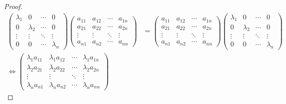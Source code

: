 \documentclass[class=linearalgebra,crop=false]{standalone}
\begin{document}
\begin{proof}
    \begingroup
    \allowdisplaybreaks
    \begin{align*}
        \begin{pmatrix}
            \lambda_{1} & 0           & \cdots & 0           \\
            0           & \lambda_{2} & \cdots & 0           \\
            \vdots      & \vdots      & \ddots & \vdots      \\
            0           & 0           & \cdots & \lambda_{n}
        \end{pmatrix}
        \begin{pmatrix}
            a_{11} & a_{12} & \cdots & a_{1n} \\
            a_{21} & a_{22} & \cdots & a_{2n} \\
            \vdots & \vdots & \ddots & \vdots \\
            a_{n1} & a_{n2} & \cdots & a_{nn}
        \end{pmatrix}
         & =
        \begin{pmatrix}
            a_{11} & a_{12} & \cdots & a_{1n} \\
            a_{21} & a_{22} & \cdots & a_{2n} \\
            \vdots & \vdots & \ddots & \vdots \\
            a_{n1} & a_{n2} & \cdots & a_{nn}
        \end{pmatrix}
        \begin{pmatrix}
            \lambda_{1} & 0           & \cdots & 0           \\
            0           & \lambda_{2} & \cdots & 0           \\
            \vdots      & \vdots      & \ddots & \vdots      \\
            0           & 0           & \cdots & \lambda_{n}
        \end{pmatrix} \\
        \Longleftrightarrow
        \begin{pmatrix}
            \lambda_{1}a_{11} & \lambda_{1}a_{12} & \cdots & \lambda_{1}a_{1n} \\
            \lambda_{2}a_{21} & \lambda_{2}a_{22} & \cdots & \lambda_{2}a_{2n} \\
            \vdots            & \vdots            & \ddots & \vdots            \\
            \lambda_{n}a_{n1} & \lambda_{n}a_{n2} & \cdots & \lambda_{n}a_{nn}
        \end{pmatrix}

\end{align*}
\end{proof}
\end{document}
